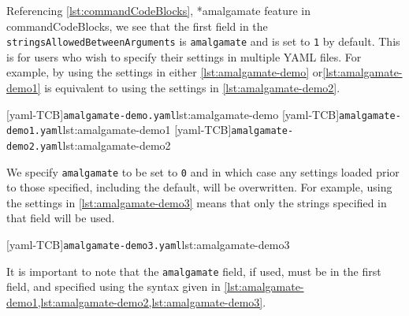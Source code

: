  Referencing \vref{lst:commandCodeBlocks}, *{amalgamate feature in
 commandCodeBlocks}, we see that the first field in the
 \texttt{stringsAllowedBetweenArguments} is \texttt{amalgamate} and is set to \texttt{1}
 by default. This is for users who wish to specify their settings in multiple YAML files.
 For example, by using the settings in either \cref{lst:amalgamate-demo}
 or\cref{lst:amalgamate-demo1} is equivalent to using the settings in
 \cref{lst:amalgamate-demo2}.%

 \begin{cmhtcbraster}[raster columns=3,
   raster left skip=-3.5cm,
   raster right skip=-2cm,
   raster column skip=.03\linewidth]
  [yaml-TCB]{\texttt{amalgamate-demo.yaml}}{lst:amalgamate-demo}
  [yaml-TCB]{\texttt{amalgamate-demo1.yaml}}{lst:amalgamate-demo1}
  [yaml-TCB]{\texttt{amalgamate-demo2.yaml}}{lst:amalgamate-demo2}
 \end{cmhtcbraster}

 We specify \texttt{amalgamate} to be set to \texttt{0} and in which case any settings
 loaded prior to those specified, including the default, will be overwritten. For example,
 using the settings in \cref{lst:amalgamate-demo3} means that only the strings specified
 in that field will be used.

 [yaml-TCB]{\texttt{amalgamate-demo3.yaml}}{lst:amalgamate-demo3}

 It is important to note that the \texttt{amalgamate} field, if used, must be in the first
 field, and specified using the syntax given in
 \cref{lst:amalgamate-demo1,lst:amalgamate-demo2,lst:amalgamate-demo3}.

